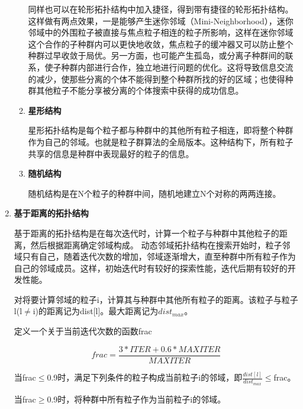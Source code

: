 \begin{enumerate}
\begin{enumerate}
		
		\hspace{2em}同样也可以在轮形拓扑结构中加入捷径，得到带有捷径的轮形拓扑结构。这样做有两点效果，一是能够产生迷你邻域（Mini-Neighborhood），迷你邻域中的外围粒子被直接与焦点粒子相连的粒子所影响，这样在迷你邻域这个合作的子种群内可以更快地收敛，焦点粒子的缓冲器又可以防止整个种群过早收敛于局优。另一方面，也可能产生孤岛，或分离子种群间的联系，使子种群内部进行合作，独立地进行问题的优化。这将导致信息交流的减少，使那些分离的个体不能得到整个种群所找的好的区域；也使得种群其他粒子不能分享被分离的个体搜索中获得的成功信息。
	
		\item \textbf{星形结构}
		
		\hspace{2em}星形拓扑结构是每个粒子都与种群中的其他所有粒子相连，即将整个种群作为自己的邻域。也就是粒子群算法的全局版本。这种结构下，所有粒子共享的信息是种群中表现最好的粒子的信息。
		\item \textbf{随机结构}
		
		\hspace{2em}随机结构是在N个粒子的种群中间，随机地建立N个对称的两两连接。
	\end{enumerate}
\item \textbf{基于距离的拓扑结构}

\hspace{2em}基于距离的拓扑结构是在每次迭代时，计算一个粒子与种群中其他粒子的距离，然后根据距离确定邻域构成。
动态邻域拓扑结构在搜索开始时，粒子邻域只有自己，随着迭代次数的增加，邻域逐渐增大，直至种群中所有粒子作为自己的邻域成员。这样，初始迭代时有较好的探索性能，迭代后期有较好的开发性能。

\hspace{2em}对将要计算邻域的粒子i，计算其与种群中其他所有粒子的距离。该粒子与粒子l(l$\neq$i)的距离记为dist[l]。最大距离记为$dist_{max}$。

定义一个关于当前迭代次数的函数frac

\begin{equation}
frac=\frac{3*ITER+0.6*MAXITER}{MAXITER}
\end{equation}

当frac$\le$0.9时，满足下列条件的粒子构成当前粒子i的邻域，即$\frac{dist[l]}{dist_{max}}$$\le$frac。

当frac$\geq$0.9时，将种群中所有粒子作为当前粒子i的邻域。


\end{enumerate}
